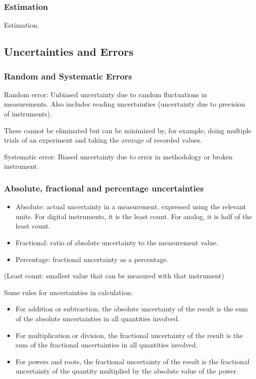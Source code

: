 \subsubsection{Estimation}
Estimation.

\subsection{Uncertainties and Errors}

\subsubsection{Random and Systematic Errors}

Random error: Unbiased uncertainty due to random fluctuations in measurements.
Also includes reading uncertainties (uncertainty due to precision of
instruments).

These cannot be eliminated but can be minimized by, for example, doing
multiple trials of an experiment and taking the average of recorded values.

Systematic error: Biased uncertainty due to error in methodology or broken
instrument.

\subsubsection{Absolute, fractional and percentage uncertainties}
\begin{itemize}
    \item Absolute: actual uncertainty in a measurement, expressed using the
        relevant units. For digital instruments, it is the least count. For
        analog, it is half of the least count.
    \item Fractional: ratio of absolute uncertainty to the measurement value.
    \item Percentage: fractional uncertainty as a percentage.
\end{itemize}
{\small (Least count: smallest value that can be measured with that instrument)}

Some rules for uncertainties in calculation:
\begin{itemize}
    \item For addition or subtraction, the absolute uncertainty of the result
        is the sum of the absolute uncertainties in all quantities involved.
    \item For multiplication or division, the fractional uncertainty of the
        result is the sum of the fractional uncertainties in all quantities
        involved.
    \item For powers and roots, the fractional uncertainty of the result is
        the fractional uncertainty of the quantity multiplied by the absolute
        value of the power.
\end{itemize}

